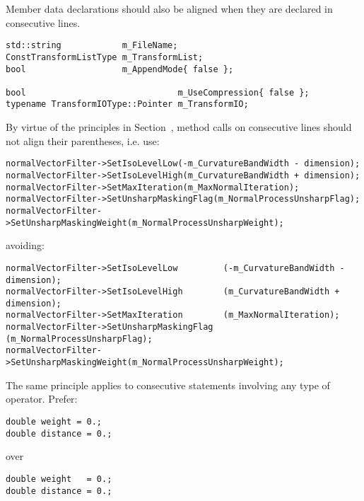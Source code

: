 Member data declarations should also be aligned when they are declared in consecutive lines.

\small
\begin{verbatim}
std::string            m_FileName;
ConstTransformListType m_TransformList;
bool                   m_AppendMode{ false };

bool                              m_UseCompression{ false };
typename TransformIOType::Pointer m_TransformIO;
\end{verbatim}
\normalsize

By virtue of the principles in Section~\href{subsec:WhiteSpaces}, method calls
on consecutive lines should not align their parentheses, i.e. use:

\small
\begin{verbatim}
normalVectorFilter->SetIsoLevelLow(-m_CurvatureBandWidth - dimension);
normalVectorFilter->SetIsoLevelHigh(m_CurvatureBandWidth + dimension);
normalVectorFilter->SetMaxIteration(m_MaxNormalIteration);
normalVectorFilter->SetUnsharpMaskingFlag(m_NormalProcessUnsharpFlag);
normalVectorFilter->SetUnsharpMaskingWeight(m_NormalProcessUnsharpWeight);
\end{verbatim}
\normalsize

avoiding:

\small
\begin{verbatim}
normalVectorFilter->SetIsoLevelLow         (-m_CurvatureBandWidth - dimension);
normalVectorFilter->SetIsoLevelHigh        (m_CurvatureBandWidth + dimension);
normalVectorFilter->SetMaxIteration        (m_MaxNormalIteration);
normalVectorFilter->SetUnsharpMaskingFlag  (m_NormalProcessUnsharpFlag);
normalVectorFilter->SetUnsharpMaskingWeight(m_NormalProcessUnsharpWeight);
\end{verbatim}
\normalsize

The same principle applies to consecutive statements involving any type of
operator. Prefer:

\small
\begin{verbatim}
double weight = 0.;
double distance = 0.;
\end{verbatim}
\normalsize

over

\small
\begin{verbatim}
double weight   = 0.;
double distance = 0.;
\end{verbatim}
\normalsize

